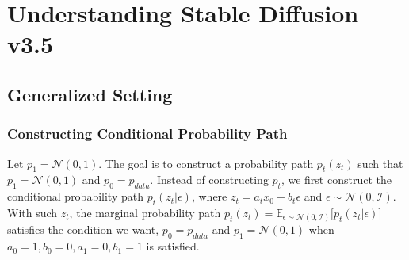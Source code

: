\chapter{Understanding Stable Diffusion v3.5}
\section{Generalized Setting}
\label{sec:setup}
\subsection{Constructing Conditional Probability Path}
Let $p_{1} = \mathcal{N} (0, 1)$. The goal is to construct a probability path $p_t(z_t)$ such that $p_1 = \mathcal{N}(0, 1)$ and $p_0 = p_{data}$. Instead of constructing $p_t$, we first construct the conditional probability path $p_t(z_t \vert \epsilon)$, where $z_t = a_t x_0 + b_t \epsilon$ and $\epsilon \sim \mathcal{N}(0, \mathcal{I})$. With such $z_t$, the marginal probability path $p_t(z_t) = \mathbb{E}_{\epsilon \sim \mathcal{N}(0, \mathcal{I})} \lbrack p_t(z_t \vert \epsilon) \rbrack$ satisfies the condition we want, $p_0 = p_{data}$ and $p_1 = \mathcal{N} (0, 1)$ when $a_0 = 1, b_0 = 0, a_1 = 0, b_1 = 1$ is satisfied.
